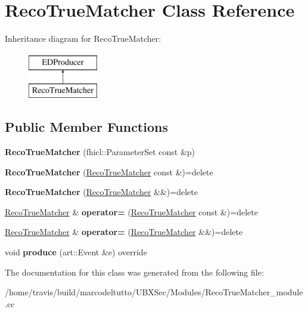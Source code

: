 \hypertarget{classRecoTrueMatcher}{\section{Reco\-True\-Matcher Class Reference}
\label{classRecoTrueMatcher}
}
Inheritance diagram for Reco\-True\-Matcher\-:\begin{figure}[H]
\begin{center}
\leavevmode
\includegraphics[height=2.000000cm]{classRecoTrueMatcher}
\end{center}
\end{figure}
\subsection*{Public Member Functions}
\begin{DoxyCompactItemize}
\item 
\hypertarget{classRecoTrueMatcher_a85eaff8fb078f81ef1ecd449ff41d694}{{\bfseries Reco\-True\-Matcher} (fhicl\-::\-Parameter\-Set const \&p)}\label{classRecoTrueMatcher_a85eaff8fb078f81ef1ecd449ff41d694}

\item 
\hypertarget{classRecoTrueMatcher_a0bd60551a7f6f542a05cdc9e83242f82}{{\bfseries Reco\-True\-Matcher} (\hyperlink{classRecoTrueMatcher}{Reco\-True\-Matcher} const \&)=delete}\label{classRecoTrueMatcher_a0bd60551a7f6f542a05cdc9e83242f82}

\item 
\hypertarget{classRecoTrueMatcher_ad71b69cce4a1a8352775223e82bc6a33}{{\bfseries Reco\-True\-Matcher} (\hyperlink{classRecoTrueMatcher}{Reco\-True\-Matcher} \&\&)=delete}\label{classRecoTrueMatcher_ad71b69cce4a1a8352775223e82bc6a33}

\item 
\hypertarget{classRecoTrueMatcher_ac3407a49992189857c73eeb46a0206af}{\hyperlink{classRecoTrueMatcher}{Reco\-True\-Matcher} \& {\bfseries operator=} (\hyperlink{classRecoTrueMatcher}{Reco\-True\-Matcher} const \&)=delete}\label{classRecoTrueMatcher_ac3407a49992189857c73eeb46a0206af}

\item 
\hypertarget{classRecoTrueMatcher_acc9f666bb0ec8acb2f1e7fef043d0151}{\hyperlink{classRecoTrueMatcher}{Reco\-True\-Matcher} \& {\bfseries operator=} (\hyperlink{classRecoTrueMatcher}{Reco\-True\-Matcher} \&\&)=delete}\label{classRecoTrueMatcher_acc9f666bb0ec8acb2f1e7fef043d0151}

\item 
\hypertarget{classRecoTrueMatcher_a9c4e732a8dba26adf726235777c2a441}{void {\bfseries produce} (art\-::\-Event \&e) override}\label{classRecoTrueMatcher_a9c4e732a8dba26adf726235777c2a441}

\end{DoxyCompactItemize}


The documentation for this class was generated from the following file\-:\begin{DoxyCompactItemize}
\item 
/home/travis/build/marcodeltutto/\-U\-B\-X\-Sec/\-Modules/Reco\-True\-Matcher\-\_\-module.\-cc\end{DoxyCompactItemize}
